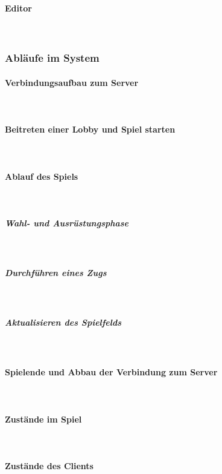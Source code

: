 \documentclass{uulm-assignment}
\begin{document}
\paragraph{Editor} \mbox{}\\


\clearpage
\subsubsection{Abläufe im System}
\paragraph{Verbindungsaufbau zum Server}
\label{connect} \mbox{}\\

\clearpage
\paragraph{Beitreten einer Lobby und Spiel starten} \mbox{}\\
\label{Sequ_Lobby}

\clearpage
\paragraph{Ablauf des Spiels} \mbox{}\\
\subparagraph{Wahl- und Ausrüstungsphase} \mbox{}\\

\clearpage
\subparagraph{Durchführen eines Zugs} \mbox{}\\

\clearpage
\subparagraph{Aktualisieren des Spielfelds} \mbox{}\\

\clearpage
\paragraph{Spielende und Abbau der Verbindung zum Server} \mbox{}\\
\label{Sequ_Winner}

\clearpage
\paragraph{Zustände im Spiel} \mbox{}\\

\clearpage
\paragraph{Zustände des Clients} \mbox{}\\

\end{document}
